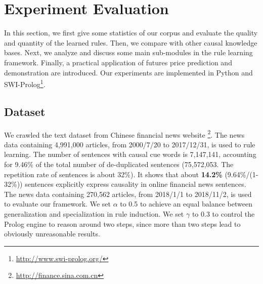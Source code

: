 \section{Experiment Evaluation}
\label{sec:experiment}
In this section, we first give some statistics of our corpus and evaluate the quality and quantity of the learned rules. Then, we compare with other causal knowledge bases. Next, we analyze and discuss some main sub-modules in the rule learning framework. Finally, a practical application of futures price prediction and demonstration are introduced. Our experiments are implemented in Python and SWI-Prolog\footnote{ \url{ http://www.swi-prolog.org/}}.
	
\subsection{Dataset}
We crawled the text dataset from Chinese financial news website \footnote{\url{ http://finance.sina.com.cn}}. The news data containing 4,991,000 articles, from 2000/7/20 to 2017/12/31, is used to rule learning.
The number of sentences with causal cue words is 7,147,141, accounting for 9.46\% of the total number of de-duplicated sentences (75,572,053. The repetition rate of sentences is about 32\%).
It shows that about  \textbf{14.2\%} (9.64\%/(1-32\%)) sentences explicitly express causality in online financial news sentences.
The news data containing 270,562 articles, from 2018/1/1 to 2018/11/2, is used to evaluate our framework. We set $\alpha$ to 0.5 to achieve an equal balance between generalization and specialization in rule induction. 
We set $\gamma$ to 0.3 to control the Prolog engine to reason around two steps, since more than two steps lead to obviously unreasonable results.


